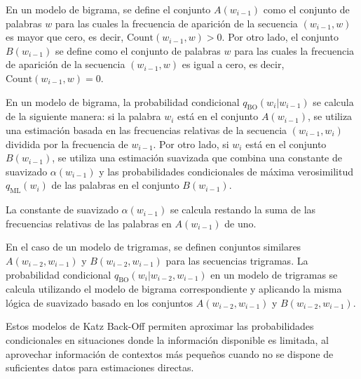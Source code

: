 En un modelo de bigrama, se define el conjunto $A(w_{i-1})$ como el conjunto de palabras $w$ para las cuales la frecuencia de aparición de la secuencia $(w_{i-1}, w)$ es mayor que cero, es decir, $\text{Count}(w_{i-1}, w) > 0$. Por otro lado, el conjunto $B(w_{i-1})$ se define como el conjunto de palabras $w$ para las cuales la frecuencia de aparición de la secuencia $(w_{i-1}, w)$ es igual a cero, es decir, $\text{Count}(w_{i-1}, w) = 0$.

En un modelo de bigrama, la probabilidad condicional $q_{\text{BO}}(w_i | w_{i-1})$ se calcula de la siguiente manera: si la palabra $w_i$ está en el conjunto $A(w_{i-1})$, se utiliza una estimación basada en las frecuencias relativas de la secuencia $(w_{i-1}, w_i)$ dividida por la frecuencia de $w_{i-1}$. Por otro lado, si $w_i$ está en el conjunto $B(w_{i-1})$, se utiliza una estimación suavizada que combina una constante de suavizado $\alpha(w_{i-1})$ y las probabilidades condicionales de máxima verosimilitud $q_{\text{ML}}(w_i)$ de las palabras en el conjunto $B(w_{i-1})$.

La constante de suavizado $\alpha(w_{i-1})$ se calcula restando la suma de las frecuencias relativas de las palabras en $A(w_{i-1})$ de uno.

En el caso de un modelo de trigramas, se definen conjuntos similares $A(w_{i-2}, w_{i-1})$ y $B(w_{i-2}, w_{i-1})$ para las secuencias trigramas. La probabilidad condicional $q_{\text{BO}}(w_i | w_{i-2}, w_{i-1})$ en un modelo de trigramas se calcula utilizando el modelo de bigrama correspondiente y aplicando la misma lógica de suavizado basado en los conjuntos $A(w_{i-2}, w_{i-1})$ y $B(w_{i-2}, w_{i-1})$.

Estos modelos de Katz Back-Off permiten aproximar las probabilidades condicionales en situaciones donde la información disponible es limitada, al aprovechar información de contextos más pequeños cuando no se dispone de suficientes datos para estimaciones directas.

